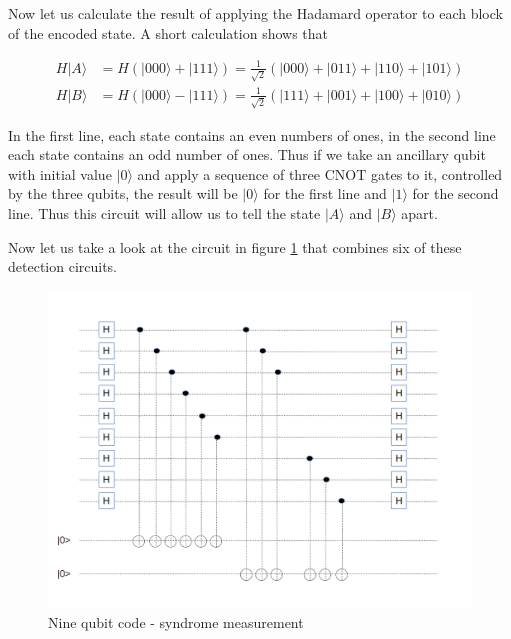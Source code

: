\documentclass[a4paper, draft]{article}
\theoremstyle{own}
\theoremstyle{remark}
\begin{document}
Now let us calculate the result of applying the Hadamard operator to each block of the encoded state. A short calculation shows that

\begin{align*}
H|A \rangle & = H(|000 \rangle + |111 \rangle) = \frac{1}{\sqrt{2}} (|000 \rangle + |011 \rangle + |110 \rangle + |101 \rangle) \\
H |B \rangle &= H(|000 \rangle - |111 \rangle) = \frac{1}{\sqrt{2}} (|111 \rangle + |001 \rangle + |100 \rangle + |010 \rangle) 
\end{align*}

In the first line, each state contains an even numbers of ones, in the second line each state contains an odd number of ones. Thus if we take an ancillary qubit with initial value $|0 \rangle$ and apply a sequence of three CNOT gates to it, controlled by the three qubits, the result will be $|0 \rangle$ for the first line and $|1 \rangle$ for the second line. Thus this circuit will allow us to tell the state $|A \rangle $ and $|B \rangle $ apart.

Now let us take a look at the circuit in figure \ref{fig:NineQubitSyndromeMeasurement} that combines six of these detection circuits.

\begin{figure}[ht]
\centering
\includegraphics[width=1.0\linewidth]{images/NineQubitSyndromeMeasurement}
\caption[Nine qubit code - syndrome measurement]{Nine qubit code - syndrome measurement}
\label{fig:NineQubitSyndromeMeasurement}
\end{figure}
\end{document}
